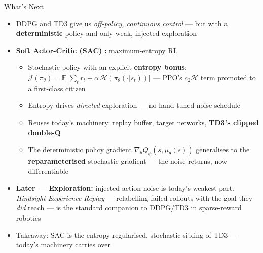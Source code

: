 \begin{frame}{What's Next}
\begin{itemize}
    \item DDPG and TD3 give us \emph{off-policy, continuous control} --- but with a \textbf{deterministic} policy and only weak, injected exploration
    \pause
    \item \textbf{Soft Actor-Critic (SAC)} \textbf{:} maximum-entropy RL
    \begin{itemize}
        \item Stochastic policy with an explicit \textbf{entropy bonus}: $\mathcal{J}(\pi_\theta) = \mathbb{E}\big[\sum_t r_t + \alpha\,\mathcal{H}(\pi_\theta(\cdot|s_t))\big]$ --- PPO's $c_2\mathcal{H}$ term promoted to a first-class citizen
        \item Entropy drives \emph{directed} exploration --- no hand-tuned noise schedule
        \item Reuses today's machinery: replay buffer, target networks, \textbf{TD3's clipped double-Q}
        \item The deterministic policy gradient $\nabla_\theta Q_\phi(s,\mu_\theta(s))$ generalises to the \textbf{reparameterised} stochastic gradient --- the noise returns, now differentiable
    \end{itemize}
    \item \textbf{Later --- Exploration:} injected action noise is today's weakest part. \emph{Hindsight Experience Replay}  --- relabelling failed rollouts with the goal they \emph{did} reach --- is the standard companion to DDPG/TD3 in sparse-reward robotics
    \item Takeaway: SAC is the entropy-regularised, stochastic sibling of TD3 --- today's machinery carries over
\end{itemize}
\end{frame}
